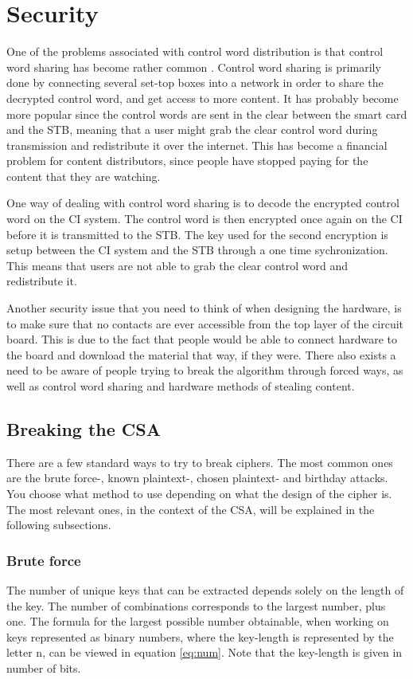\section{Security}
One of the problems associated with control word distribution is that 
control word sharing has become rather common \citep{Farncombe}. 
Control word sharing is primarily done by connecting several set-top boxes
into a network in order to share the decrypted control word, and get access
to more content. It has probably become more popular since the control 
words are sent in the clear between the smart card and the STB, meaning 
that a user might grab the clear control word during transmission and 
redistribute it over the internet. This has become a financial problem 
for content distributors, since people have stopped paying for the 
content that they are watching.

One way of dealing with control word sharing is to decode the encrypted 
control word on the CI system. The control word is then encrypted once 
again on the CI before it is transmitted to the STB. The key used for 
the second encryption is setup between the CI system and the STB through 
a one time sychronization. This means that users are not able to grab 
the clear control word and redistribute it. \citep[pp. 12--13]{HIS:2011}

Another security issue that you need to think of when designing the 
hardware, is to make sure that no contacts are ever accessible from 
the top layer of the circuit board. This is due to the fact that 
people would be able to connect hardware to the board and download 
the material that way, if they were.
There also exists a need to be aware of people trying to break the 
algorithm through forced ways, as well as control word sharing and 
hardware methods of stealing content.

\subsection{Breaking the CSA}
There are a few standard ways to try to break ciphers. The most common 
ones are the brute force-, known plaintext-, chosen plaintext- and 
birthday attacks. You choose what method to use depending on what the 
design of the cipher is. The most relevant ones, in the context of the 
CSA, will be explained in the following subsections.
\citep[pp. 31-34]{Schneier:2003}

\subsubsection{Brute force}
The number of unique keys that can be extracted depends solely on the 
length of the key. The number of combinations corresponds to the 
largest number, plus one. The formula for the largest possible number 
obtainable, when working on keys represented as binary numbers, where 
the key-length is represented by the letter n, can be viewed in equation
\ref{eq:num}. Note that the key-length is given in number of bits.

